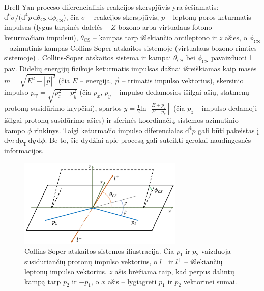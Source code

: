 \documentclass[a4paper, 12pt, oneside]{article}
\newcommand{\pT}{p_{\mathrm{T}}}
\newlength\q
\begin{document}
Drell-Yan proceso diferencialinis reakcijos skerspjūvis yra šešiamatis:
$\mathrm{d}^6\sigma/(\mathrm{d}^4p\,\mathrm{d}\theta_{\mathrm{CS}}\,\mathrm{d}\phi_\mathrm{CS}$), čia $\sigma$ -- reakcijos skerspjūvis,
$p$ -- leptonų poros keturmatis impulsas (lygus tarpinės dalelės -- $Z$ bozono arba virtualaus fotono -- keturmačiam
impulsui), $\theta_{\mathrm{CS}}$ -- kampas tarp išlekiančio antileptono ir $z$ ašies, o $\phi_{\mathrm{CS}}$ -- azimutinis kampas
Collins-Soper atskaitos sistemoje (virtualaus bozono rimties sistemoje) \cite{DYangular}.
Collins-Soper atskaitos sistema ir kampai $\theta_{\mathrm{CS}}$ bei $\phi_{\mathrm{CS}}$ pavaizduoti \ref{fig:CSframe} pav.
Didelių energijų fizikoje keturmatis impulsas dažnai išreiškiamas kaip masės $m=\sqrt{E^2-|\vec{p}|^2}$ (čia $E$ -- energija,
$\vec{p}$ -- trimatis impulso vektorius), skersinio impulso $\pT=\sqrt{p_x^2+p_y^2}$ (čia $p_x$, $p_y$ -- impulso dedamosios
išilgai ašių, statmenų protonų susidūrimo krypčiai), spartos $y=\frac{1}{2}\mathrm{ln}[\frac{E+p_z}{E-p_z}]$ (čia $p_z$ -- impulso dedamoji
išilgai protonų susidūrimo ašies) ir sferinės koordinačių sistemos azimutinio kampo $\phi$ rinkinys.
Taigi keturmačio impulso diferencialas $\mathrm{d}^4p$ gali būti pakeistas į $\mathrm{d}m\,\mathrm{d}\pT\,\mathrm{d}y\,\mathrm{d}\phi$.
Be to, šie dydžiai apie procesą gali suteikti gerokai naudingesnės informacijos.

\begin{figure}[b!]
	\includegraphics[width=0.7\textwidth]{Magistrinis/CSframe.png}
	\caption{\label{fig:CSframe} Collins-Soper atskaitos sistemos iliustracija.
	Čia $p_1$ ir $p_2$ vaizduoja susiduriančių protonų impulso vektorius, o $l^-$ ir $l^+$ -- išlekiančių leptonų impulso vektorius.
	$z$ ašis brėžiama taip, kad perpus dalintų kampą tarp $p_2$ ir $-p_1$, o $x$ ašis -- lygiagreti $p_1$ ir $p_2$ vektorinei sumai.}
\end{figure}
\end{document}
